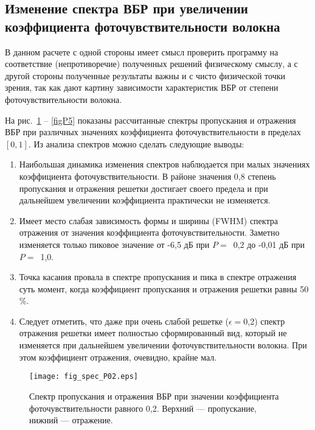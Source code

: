 
\subsection{Изменение спектра ВБР при увеличении коэффициента фоточувствительности волокна}

В данном расчете с одной стороны имеет смысл проверить программу на соответствие (непротиворечие) полученных решений физическому смыслу, а с другой стороны полученные результаты важны и с чисто физической точки зрения, так как дают картину зависимости характеристик ВБР от степени фоточувствительности волокна.

На рис.~\ref{figP1} -- \ref{figP5} показаны рассчитанные спектры пропускания и отражения ВБР при различных значениях коэффициента фоточувствительности в пределах $[0,1]$. Из анализа спектров можно сделать следующие выводы:
\begin{enumerate}
\item {Наибольшая динамика изменения спектров наблюдается при малых значениях коэффициента фоточувствительности. В районе значения 0,8 степень пропускания и отражения решетки достигает своего предела и при дальнейшем увеличении коэффициента практически не изменяется.}
\item {Имеет место слабая зависимость формы и ширины (FWHM) спектра отражения от значения коэффициента фоточувствительности. Заметно изменяется только пиковое значение от -6,5 дБ при $P=$~0,2 до -0,01 дБ при $P=$~1,0.}
\item {Точка касания провала в спектре пропускания и пика в спектре отражения суть момент, когда коэффициент пропускания и отражения решетки равны 50 \%.}
\item {Следует отметить, что даже при очень слабой решетке ($\epsilon = 0$,2) спектр отражения решетки имеет полностью сформированный вид, который не изменяется при дальнейшем увеличении фоточувствительности волокна. При этом коэффициент отражения, очевидно, крайне мал.}
\end{enumerate}

\begin{figure}
  \centering
  \texttt{[image: fig\_spec\_P02.eps]}\\
  \caption{Спектр пропускания и отражения ВБР при значении коэффициента фоточувствительности равного 0,2. Верхний --- пропускание, нижний --- отражение.}\label{figP1}
\end{figure}

